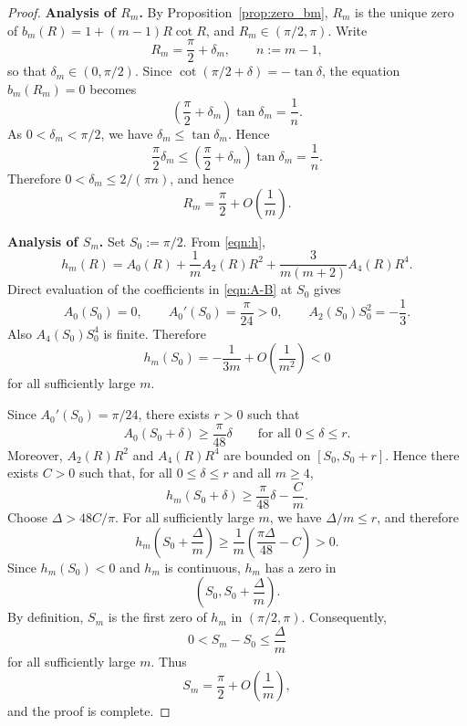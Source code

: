 \documentclass[10pt,a4paper]{amsart}
\begin{document}
\begin{proof}
\textbf{Analysis of \(R_m\).} By Proposition~\ref{prop:zero_bm}, \(R_m\) is the unique zero of \(b_m(R)=1+(m-1)R\cot R\), and \(R_m\in(\pi/2,\pi)\). Write
\[
R_m=\frac{\pi}{2}+\delta_m,
\qquad
n:=m-1,
\]
so that \(\delta_m\in(0,\pi/2)\). Since \(\cot(\pi/2+\delta)=-\tan\delta\), the equation \(b_m(R_m)=0\) becomes
\[
\left(\frac{\pi}{2}+\delta_m\right)\tan\delta_m=\frac{1}{n}.
\]
As \(0<\delta_m<\pi/2\), we have \(\delta_m\le\tan\delta_m\). Hence
\[
\frac{\pi}{2}\delta_m
\le
\left(\frac{\pi}{2}+\delta_m\right)\tan\delta_m
=
\frac{1}{n}.
\]
Therefore \(0<\delta_m\le 2/(\pi n)\), and hence
\[
R_m=\frac{\pi}{2}+O\!\left(\frac{1}{m}\right).
\]

\textbf{Analysis of \(S_m\).}  Set \(S_0:=\pi/2\). From \eqref{eqn:h},
\[
h_m(R)=A_0(R)+\frac{1}{m}A_2(R)R^2+\frac{3}{m(m+2)}A_4(R)R^4.
\]
Direct evaluation of the coefficients in \eqref{eqn:A-B} at \(S_0\) gives
\[
A_0(S_0)=0,
\qquad
A_0'(S_0)=\frac{\pi}{24}>0,
\qquad
A_2(S_0)S_0^2=-\frac{1}{3}.
\]
Also \(A_4(S_0)S_0^4\) is finite. Therefore
\[
h_m(S_0)
=
-\frac{1}{3m}
+
O\!\left(\frac{1}{m^2}\right)
<0
\]
for all sufficiently large \(m\).

Since \(A_0'(S_0)=\pi/24\), there exists \(r>0\) such that
\[
A_0(S_0+\delta)\ge \frac{\pi}{48}\delta
\qquad
\text{for all }0\le\delta\le r.
\]
Moreover, \(A_2(R)R^2\) and \(A_4(R)R^4\) are bounded on \([S_0,S_0+r]\). Hence there exists \(C>0\) such that, for all \(0\le\delta\le r\) and all \(m\ge4\),
\[
h_m(S_0+\delta)
\ge
\frac{\pi}{48}\delta-\frac{C}{m}.
\]
Choose \(\Delta>48C/\pi\). For all sufficiently large \(m\), we have \(\Delta/m\le r\), and therefore
\[
h_m\!\left(S_0+\frac{\Delta}{m}\right)
\ge
\frac{1}{m}\left(\frac{\pi\Delta}{48}-C\right)>0.
\]
Since \(h_m(S_0)<0\) and \(h_m\) is continuous, \(h_m\) has a zero in
\[
\left(S_0,S_0+\frac{\Delta}{m}\right).
\]
By definition, \(S_m\) is the first zero of \(h_m\) in \((\pi/2,\pi)\). Consequently,
\[
0<S_m-S_0\le \frac{\Delta}{m}
\]
for all sufficiently large \(m\). Thus
\[
S_m=\frac{\pi}{2}+O\!\left(\frac{1}{m}\right),
\]
and the proof is complete.
\end{proof}
\end{document}
